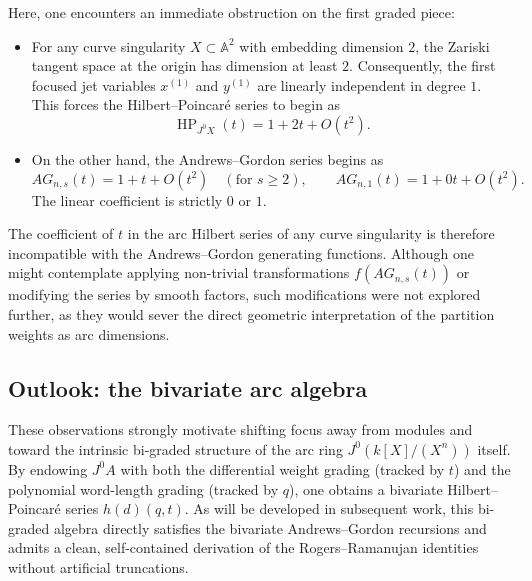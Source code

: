 \documentclass[a4paper, 12pt]{amsart}
\theoremstyle{definition}
\theoremstyle{remark}
\begin{document}
Here, one encounters an immediate obstruction on the first graded piece:
\begin{itemize}
  \item
  For any curve singularity $X \subset \mathbb{A}^2$ with embedding dimension $2$,
  the Zariski tangent space at the origin has dimension at least $2$.
  Consequently, the first focused jet variables $x^{(1)}$ and $y^{(1)}$
  are linearly independent in degree $1$.
  This forces the Hilbert--Poincar\'{e} series to begin as
  \begin{equation*}
    \operatorname{HP}_{J^0X}(t) = 1 + 2t + O(t^2).
  \end{equation*}
  \item
  On the other hand, the Andrews--Gordon series begins as
  \begin{equation*}
    AG_{n, s}(t) = 1 + t + O(t^2) \quad (\text{for } s \ge 2),
    \qquad
    AG_{n, 1}(t) = 1 + 0t + O(t^2).
  \end{equation*}
  The linear coefficient is strictly $0$ or $1$.
\end{itemize}
The coefficient of $t$ in the arc Hilbert series of any curve singularity
is therefore incompatible with the Andrews--Gordon generating functions.
Although one might contemplate applying non-trivial transformations
$f(AG_{n, s}(t))$ or modifying the series by smooth factors,
such modifications were not explored further,
as they would sever the direct geometric interpretation
of the partition weights as arc dimensions.

\subsection{Outlook: the bivariate arc algebra}
\label{sec:outlook-bivariate}

These observations strongly motivate shifting focus away from modules
and toward the intrinsic bi-graded structure of the arc ring $J^0(k[X]/(X^n))$ itself.
By endowing $J^0A$ with both the differential weight grading (tracked by $t$)
and the polynomial word-length grading (tracked by $q$),
one obtains a bivariate Hilbert--Poincar\'{e} series $h(d)(q, t)$.
As will be developed in subsequent work,
this bi-graded algebra directly satisfies the bivariate Andrews--Gordon recursions
and admits a clean, self-contained derivation
of the Rogers--Ramanujan identities without artificial truncations.

\printindex
\end{document}
